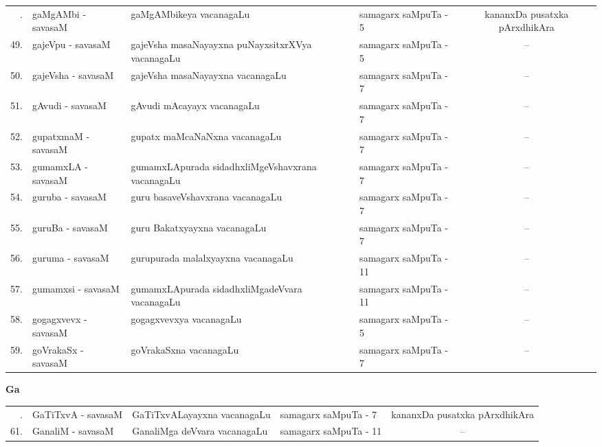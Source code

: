 {\renewcommand{\arraystretch}{1.35}
\begin{longtable}{rl>{\raggedright}p{5.5cm}lc}
\endfirsthead
\endhead
\endfoot
\endlastfoot
48. &  gaMgAMbi - savasaM & gaMgAMbikeya vacanagaLu & samagarx saMpuTa - 5  & kananxDa pusatxka pArxdhikAra\\
49. &  gajeVpu - savasaM & gajeVsha masaNayayxna puNayxsitxrXVya vacanagaLu & samagarx saMpuTa - 5 & --\\
50. &  gajeVsha - savasaM & gajeVsha masaNayayxna vacanagaLu & samagarx saMpuTa - 7 & --\\
51. &  gAvudi - savasaM &  gAvudi mAcayayx vacanagaLu & samagarx saMpuTa - 7 & --\\
52. &  gupatxmaM - savasaM & gupatx maMcaNaNxna vacanagaLu & samagarx saMpuTa - 7 & --\\
53. &  gumamxLA - savasaM & gumamxLApurada sidadhxliMgeVshavxrana\newline \phantom{AA} vacanagaLu & samagarx saMpuTa - 7 & --\\
54. &  guruba - savasaM & guru basaveVshavxrana vacanagaLu & samagarx saMpuTa - 7 & --\\
55. &  guruBa - savasaM & guru Bakatxyayxna vacanagaLu & samagarx saMpuTa - 7 & --\\
56. &  guruma - savasaM & gurupurada malalxyayxna vacanagaLu & samagarx saMpuTa - 11 & --\\
57. &  gumamxsi - savasaM & gumamxLApurada sidadhxliMgadeVvara\newline \phantom{AA} vacanagaLu & samagarx saMpuTa - 11 & --\\
58. & gogagxvevx  - savasaM & gogagxvevxya vacanagaLu & samagarx saMpuTa - 5 & --\\
59. &  goVrakaSx - savasaM & goVrakaSxna vacanagaLu & samagarx saMpuTa - 7 & --\\
\end{longtable}}

\medskip

\centerline{\bf Ga}

{\renewcommand{\arraystretch}{1.32}
\begin{longtable}{rl>{\raggedright}p{5.5cm}lc}
\endfirsthead
\endhead
\endfoot
\endlastfoot
60. &  GaTiTxvA - savasaM & GaTiTxvALayayxna vacanagaLu & samagarx saMpuTa - 7 & kananxDa pusatxka pArxdhikAra\\
61. &  GanaliM - savasaM & GanaliMga deVvara vacanagaLu & samagarx saMpuTa - 11  & --\\
\end{longtable}}


